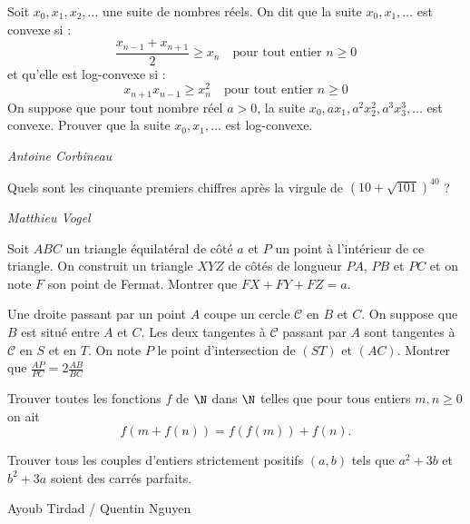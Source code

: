 \begin{exo}{}
Soit $x_0, x_1, x_2, \ldots $ une suite de nombres réels. On dit que la suite $x_0, x_1, \ldots$ est convexe si :
\[
\frac{x_{n-1}+x_{n+1}}{2}\geq x_n\quad \textrm {pour tout entier } n \geq 0
\]
et qu'elle est log-convexe si :
\[
x_{n+1}x_{n-1}\geq x_n^2\quad \textrm {pour tout entier } n \geq 0
\]
 On suppose que pour tout nombre réel $a>0$, la suite $x_0, a x_1, a^2 x_2^2, a^3 x_3^3, \ldots$ est convexe. Prouver que la suite $x_0, x_1, \ldots $ est log-convexe.
 
 \medskip
\textit{Antoine Corbineau}
\end{exo}



\begin{exo}{}
Quels sont les cinquante premiers chiffres après la virgule de $(10+\sqrt{101})^{40}$ ?


\medskip
\textit{Matthieu Vogel}
\end{exo}

\begin{exo}{}
Soit $ABC$ un triangle équilatéral de côté $a$ et $P$ un point à l'intérieur de ce triangle. On construit un triangle $XYZ$ de côtés de longueur $PA$, $PB$ et $PC$ et on note $F$ son point de Fermat. Montrer que $FX+FY+FZ=a$.
\end{exo}

\begin{exo}{}
Une droite passant par un point $A$ coupe un cercle $ \mathcal{C}$ en $B$ et $C$. On suppose que $B$ est situé entre $A$ et $C$. Les deux tangentes à $ \mathcal{C}$ passant par $A$ sont tangentes à $ \mathcal{C}$ en $S$ et en $T$. On note $P$ le point d'intersection de $(ST)$ et $(AC)$. Montrer que
$ \frac{AP}{PC}=2\frac{AB}{BC} $

\end{exo}

\begin{exo}{}Trouver toutes les fonctions $f$ de $ \N$ dans $ \N$ telles que pour tous entiers $m,n \geq 0$ on ait
$$f(m+f(n))=f(f(m))+f(n).$$
\end{exo}

\begin{exo}{}
Trouver tous les couples d'entiers strictement positifs $(a,b)$ tels que $a^2+3b$ et $b^2+3a$ soient des carrés parfaits.

Ayoub Tirdad / Quentin Nguyen
\end{exo}



